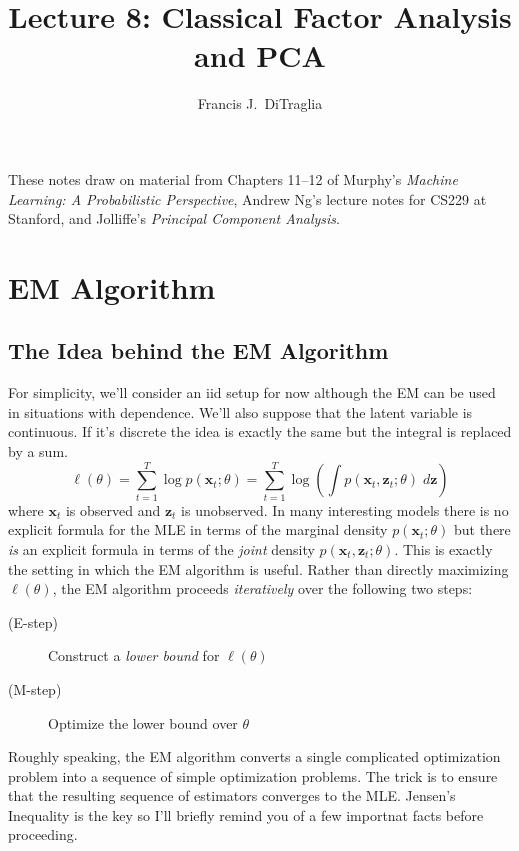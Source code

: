 \documentclass[12pt]{article}
\theoremstyle{definition}
\begin{document}
\title{Lecture 8: Classical Factor Analysis and PCA}

\author{Francis J.\ DiTraglia}

\maketitle 

\noindent 
These notes draw on material from Chapters 11--12 of Murphy's \emph{Machine Learning: A Probabilistic Perspective}, Andrew Ng's lecture notes for CS229 at Stanford, and Jolliffe's \emph{Principal Component Analysis}.

\section{EM Algorithm}


\subsection{The Idea behind the EM Algorithm}
For simplicity, we'll consider an iid setup for now although the EM can be used in situations with dependence. We'll also suppose that the latent variable is continuous. If it's discrete the idea is exactly the same but the integral is replaced by a sum.
	$$\ell(\theta) = \sum_{t=1}^T \log p(\textbf{x}_t;\theta) = \sum_{t=1}^T \log \left(\int p(\textbf{x}_t,	\textbf{z}_t;\theta)\; d \textbf{z} \right)$$
where $\mathbf{x}_t$ is observed and $\mathbf{z}_t$ is unobserved. In many interesting models there is no explicit formula for the MLE in terms of the marginal density $p(\mathbf{x}_t;\theta)$ but there \emph{is} an explicit formula in terms of the \emph{joint} density $p(\mathbf{x}_t,\mathbf{z}_t;\theta)$. This is exactly the setting in which the EM algorithm is useful. Rather than directly maximizing $\ell(\theta)$, the EM algorithm proceeds \emph{iteratively} over the following two steps:
	\begin{description}
		\item[(E-step)] Construct a \emph{lower bound} for $\ell(\theta)$
		\item[(M-step)] Optimize the lower bound over $\theta$
	\end{description}
Roughly speaking, the EM algorithm converts a single complicated optimization problem into a sequence of simple optimization problems. The trick is to ensure that the resulting sequence of estimators converges to the MLE. Jensen's Inequality is the key so I'll briefly remind you of a few importnat facts before proceeding. 
\end{document}

